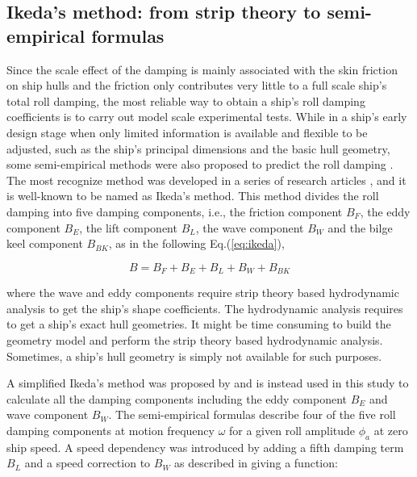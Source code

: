 
\subsection{Ikeda's method: from strip theory to semi-empirical formulas}
\label{se:semi-empirical methods}
Since the scale effect of the damping is mainly associated with the skin friction on ship hulls and the friction only contributes very little to a full scale ship's total roll damping, the most reliable way to obtain a ship's roll damping coefficients is to carry out model scale experimental tests. 
While in a ship's early design stage when only limited information is available and flexible to be adjusted, such as the ship's principal dimensions and the basic hull geometry, some semi-empirical methods were also proposed to predict the roll damping \parencite{himeno_prediction_1981}. The most recognize method was developed in a series of research articles \parencite{ikeda_roll_1978,ikeda_eddy_1978,ikeda_roll_1979,ikeda_components_1978,ikeda_velocity_1979}, and it is well-known to be named as Ikeda's method. This method divides the roll damping into five damping components, i.e., the friction component $B_F$, the eddy component $B_E$, the lift component $B_L$, the wave component $B_W$ and the bilge keel component $B_{BK}$, as in the following Eq.(\ref{eq:ikeda}), 

\begin{equation} \label{eq:ikeda}
B = B_F + B_E + B_L + B_W + B_{BK}
\end{equation}

where the wave and eddy components require strip theory based hydrodynamic analysis to get the ship's shape coefficients. The hydrodynamic analysis requires to get a ship's exact hull geometries. It might be time consuming to build the geometry model and perform the strip theory based hydrodynamic analysis. Sometimes, a ship's hull geometry is simply not available for such purposes. 

A simplified Ikeda's method was proposed by \parencite{kawahara_simple_2011} and is instead used in this study to calculate all the damping components including the eddy component $B_E$ and wave component $B_W$. The semi-empirical formulas describe four of the five roll damping components at motion frequency $\omega$ for a given roll amplitude $\phi_a$ at zero ship speed. A speed dependency was introduced by adding a fifth damping term $B_L$ and a speed correction to $B_W$ as described in \parencite{ikeda_velocity_1979} giving a function: 

